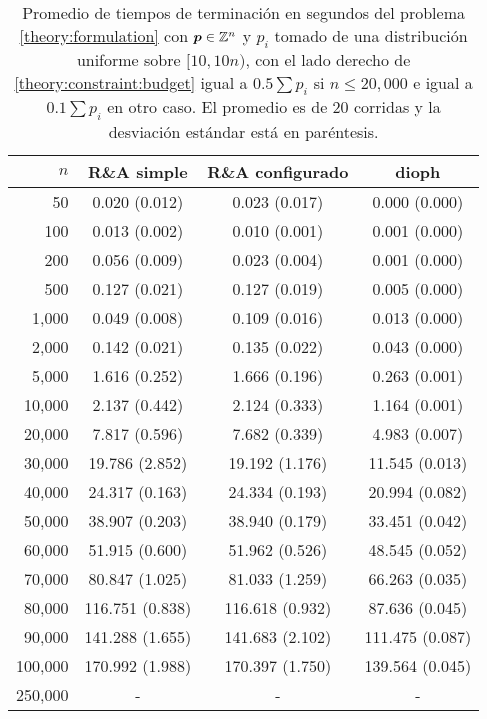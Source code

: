 \begin{table}[h]
	\centering
	\begin{tabular}{rccc} \toprule
		$n$ & R\&A simple & R\&A configurado & dioph \\ \midrule
		50     & 0.020 (0.012) & 0.023 (0.017) & 0.000 (0.000) \\
		100    & 0.013 (0.002) & 0.010 (0.001) & 0.001 (0.000) \\
		200    & 0.056 (0.009) & 0.023 (0.004) & 0.001 (0.000) \\
		500    & 0.127 (0.021) & 0.127 (0.019) & 0.005 (0.000) \\ \midrule
		1,000   & 0.049 (0.008) & 0.109 (0.016) & 0.013 (0.000) \\
		2,000   & 0.142 (0.021) & 0.135 (0.022) & 0.043 (0.000) \\
		5,000   & 1.616 (0.252) & 1.666 (0.196) & 0.263 (0.001) \\
		10,000  & 2.137 (0.442) & 2.124 (0.333) & 1.164 (0.001) \\ \midrule
		20,000  & 7.817 (0.596) & 7.682 (0.339) & 4.983 (0.007) \\
		30,000  & 19.786 (2.852) & 19.192 (1.176) & 11.545 (0.013) \\
		40,000  & 24.317 (0.163) & 24.334 (0.193) & 20.994 (0.082) \\
		50,000  & 38.907 (0.203) & 38.940 (0.179) & 33.451 (0.042) \\ \midrule
		60,000  & 51.915 (0.600) & 51.962 (0.526) & 48.545 (0.052) \\
		70,000  & 80.847 (1.025) & 81.033 (1.259) & 66.263 (0.035) \\
		80,000  & 116.751 (0.838) & 116.618 (0.932) & 87.636 (0.045) \\
		90,000  & 141.288 (1.655) & 141.683 (2.102) & 111.475 (0.087) \\ \midrule
		100,000 & 170.992 (1.988) & 170.397 (1.750) & 139.564 (0.045) \\
		250,000 & - & - & - \\ \bottomrule
	\end{tabular}
	\caption{Promedio de tiempos de terminación en segundos del problema \eqref{theory:formulation}
		con $\boldsymbol{p} \in \mathbb{Z}^n$ y $p_i$ tomado de una distribución uniforme sobre $[10, 10n)$, con el
		lado derecho de \eqref{theory:constraint:budget} igual a $0.5\sum p_i$ si  $n \leq 20,000$ e
		igual a $0.1\sum p_i$ en otro caso. El promedio es de 20 corridas y la desviación estándar está
		en paréntesis.}
	\label{table:fin:mt:times}
\end{table}

